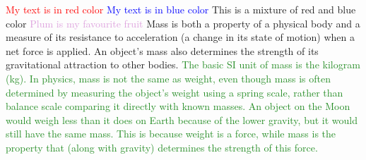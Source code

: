 \documentclass{article}
\begin{document}
	\pagecolor{Goldenrod!50}
	\textcolor{red}{My text is in red color}
	\textcolor{blue}{My text is in blue color}
	\textcolor{red!50!blue}{This is a mixture of red and blue color}
	\textcolor{Plum}{Plum is my favourite fruit}
	\textcolor{WildStrawberry}{Mass is both a property of a physical body and a measure of its resistance to acceleration (a change in its state of motion) when a net force is applied. An object's mass also determines the strength of its gravitational attraction to other bodies.}
	\textcolor{ForestGreen}{The basic SI unit of mass is the kilogram (kg). In physics, mass is not the same as weight, even though mass is often determined by measuring the object's weight using a spring scale, rather than balance scale comparing it directly with known masses. An object on the Moon would weigh less than it does on Earth because of the lower gravity, but it would still have the same mass. This is because weight is a force, while mass is the property that (along with gravity) determines the strength of this force.}
\end{document}
